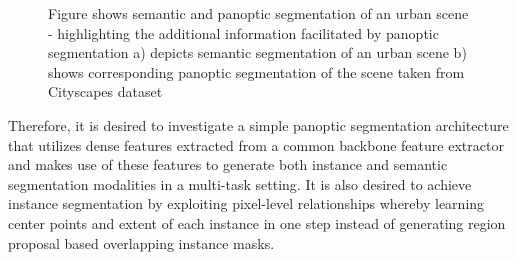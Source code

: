 \begin{figure}[!ht]
            \caption[Semantic and Panoptic Segmentation] {Figure shows semantic and panoptic segmentation of an urban scene - highlighting the additional information facilitated by panoptic segmentation a) depicts semantic segmentation of an urban scene b) shows corresponding panoptic segmentation of the scene taken from Cityscapes dataset \cite{Cordts2015}}
\end{figure}





Therefore, it is desired to investigate a simple panoptic segmentation architecture that utilizes dense features extracted from a common backbone feature extractor and makes use of these features to generate both instance and semantic segmentation modalities in a multi-task setting. It is also desired to achieve instance segmentation by exploiting pixel-level relationships whereby learning center points and extent of each instance in one step instead of generating region proposal based overlapping instance masks. 

